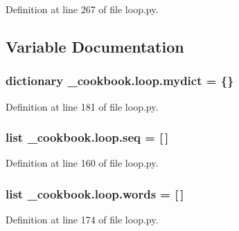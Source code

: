 Definition at line 267 of file loop.\-py.



\subsection{Variable Documentation}
\hypertarget{namespace__cookbook_1_1loop_a6e274a42a5573ac12fed6a6f9c318fe0}{
\subsubsection[{mydict}]{\setlength{\rightskip}{0pt plus 5cm}dictionary \-\_\-cookbook.\-loop.\-mydict = \{\}}}\label{namespace__cookbook_1_1loop_a6e274a42a5573ac12fed6a6f9c318fe0}


Definition at line 181 of file loop.\-py.

\hypertarget{namespace__cookbook_1_1loop_a5de56a796b0d1e61c000d4258c4174c4}{
\subsubsection[{seq}]{\setlength{\rightskip}{0pt plus 5cm}list \-\_\-cookbook.\-loop.\-seq = \mbox{[}$\,$\mbox{]}}}\label{namespace__cookbook_1_1loop_a5de56a796b0d1e61c000d4258c4174c4}


Definition at line 160 of file loop.\-py.

\hypertarget{namespace__cookbook_1_1loop_a65ecd74c88616db43b44e064e12bb30a}{
\subsubsection[{words}]{\setlength{\rightskip}{0pt plus 5cm}list \-\_\-cookbook.\-loop.\-words = \mbox{[}$\,$\mbox{]}}}\label{namespace__cookbook_1_1loop_a65ecd74c88616db43b44e064e12bb30a}


Definition at line 174 of file loop.\-py.

